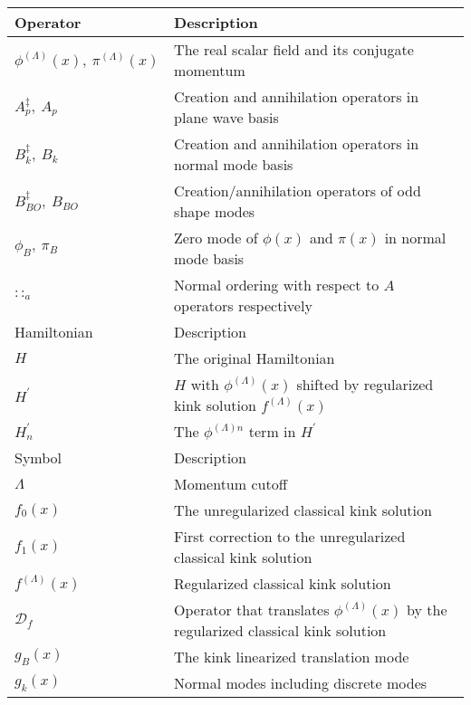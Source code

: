 \def\letter{0}\def\pr{0}\documentclass[a4paper,12pt, epsfig]{article}
\newcommand{\vac}{\ensuremath{|0\rangle}}
\renewcommand{\(}{\begin{equation}}
\renewcommand{\)}{end{equation} \vspace{-.05in}\linebreak}
\renewcommand{\=}{\hspace{-.03in}=\hspace{-.02in}}
\renewcommand{\(}{\begin{equation}}
\renewcommand{\)}{\end{equation}}
\newcommand{\p}{^\prime}
\renewcommand{\(}{\begin{equation}}
\renewcommand{\)}{\end{equation}}
\def\df{\mathcal{D}_f}
\renewcommand{\L}{{(\Lambda)}}
\begin{document}
\begin{table}
\begin{tabular}{|l|l|}
\hline
Operator&Description\\
\hline
$\phi^\L(x),\ \pi^\L(x)$&The real scalar field and its conjugate momentum\\
$A^\ddag_p,\ A_p$&Creation and annihilation operators in plane wave basis\\
$B^\ddag_k,\ B_k$&Creation and annihilation operators in normal mode basis\\
$B^\ddag_{BO},\ B_{BO}$&Creation/annihilation operators of odd shape modes\\
$\phi_B,\ \pi_B$&Zero mode of $\phi(x)$ and $\pi(x)$ in normal mode basis\\
$::_a$&Normal ordering with respect to $A$ operators respectively\\
\hline
\hline
Hamiltonian&Description\\
\hline
$H$&The original Hamiltonian\\
$H^\prime$&$H$ with $\phi^\L(x)$ shifted by regularized kink solution $f^\L(x)$\\
$H\p_n$&The $\phi^{\L n}$ term in $H^\prime$\\
\hline
Symbol&Description\\
\hline
$\Lambda$&Momentum cutoff\\
$f_0(x)$&The unregularized classical kink solution\\
$f_1(x)$&First correction to the unregularized classical kink solution\\
$f^\L(x)$&Regularized classical kink solution\\
$\df$&Operator that translates $\phi^\L(x)$ by the regularized classical kink solution\\
$g_B(x)$&The kink linearized translation mode\\
$g_k(x)$&Normal modes including discrete modes\\

\end{tabular}
\end{table}
\end{document}
